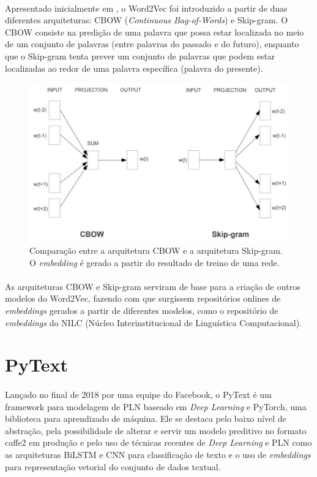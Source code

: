 \documentclass[grad,numbers]{coppe}
\begin{document}
  			\paragraph{}Apresentado inicialmente em \cite{word2vec-paper}, o Word2Vec foi introduzido a partir de duas diferentes arquiteturas: CBOW (\textit{Continuous Bag-of-Words}) e Skip-gram. O CBOW consiste na predição de uma palavra que possa estar localizada no meio de um conjunto de palavras (entre palavras do passado e do futuro), enquanto que o Skip-gram tenta prever um conjunto de palavras que podem estar localizadas ao redor de uma palavra específica (palavra do presente).
	  		\begin{figure}[h]
  				{\includegraphics[width=15cm]{word2vec-cbowskipgram.jpg}
  					\caption{Comparação entre a arquitetura CBOW e a arquitetura Skip-gram\cite{word2vec-paper}. O \textit{embedding} é gerado a partir do resultado de treino de uma rede.}
  					\label{fig:word2vec-cbowskipgram-fig}}
  			\end{figure}
	  		\paragraph{}As arquiteturas CBOW e Skip-gram serviram de base para a criação de outros modelos do Word2Vec, fazendo com que surgissem repositórios onlines de \textit{embeddings} gerados a partir de diferentes modelos, como o repositório de \textit{embeddings} do NILC (Núcleo Interinstitucional de Linguística Computacional)\cite{nilc-repo}.
  \section{PyText}
  	\paragraph{}Lançado no final de 2018 por uma equipe do Facebook, o PyText é um framework para modelagem de PLN baseado em \textit{Deep Learning} e PyTorch, uma biblioteca para aprendizado de máquina. Ele se destaca pelo baixo nível de abstração, pela possibilidade de alterar e servir um modelo preditivo no formato caffe2 em produção e pelo uso de técnicas recentes de \textit{Deep Learning} e PLN como as arquiteturas BiLSTM e CNN para classificação de texto e o uso de \textit{embeddings} para representação vetorial do conjunto de dados textual.
\end{document}
